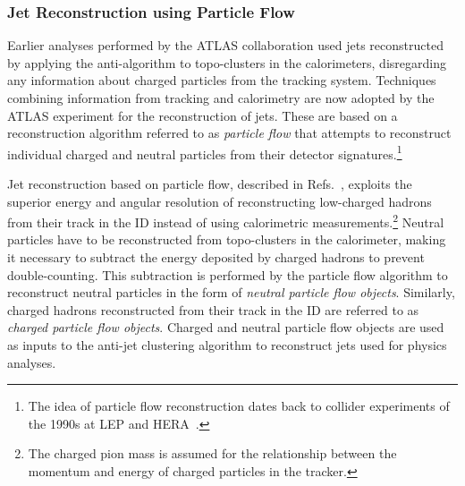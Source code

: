 \subsubsection{Jet Reconstruction using Particle Flow}


Earlier analyses performed by the ATLAS collaboration used jets reconstructed by
applying the anti-\kt algorithm to topo-clusters in the calorimeters,
disregarding any information about charged particles from the tracking
system. Techniques combining information from tracking and calorimetry are now
adopted by the ATLAS experiment for the reconstruction of jets. These are based
on a reconstruction algorithm referred to as \emph{particle flow} that attempts
to reconstruct individual charged and neutral particles from their detector
signatures.\footnote{The idea of particle flow reconstruction dates back to
  collider experiments of the 1990s at LEP and HERA~\cite{PERF-2015-09}.}

Jet reconstruction based on particle flow, described in
Refs.~\cite{PERF-2015-09,JETM-2018-05}, exploits the superior energy and angular
resolution of reconstructing low-\pT charged hadrons from their track in the ID
instead of using calorimetric measurements.\footnote{The charged pion mass is
  assumed for the relationship between the momentum and energy of charged
  particles in the tracker.} Neutral particles have to be reconstructed from
topo-clusters in the calorimeter, making it necessary to subtract the energy
deposited by charged hadrons to prevent double-counting. This subtraction is
performed by the particle flow algorithm to reconstruct neutral particles in the
form of \emph{neutral particle flow objects}. Similarly, charged hadrons
reconstructed from their track in the ID are referred to as \emph{charged
  particle flow objects}.  Charged and neutral particle flow objects are used as
inputs to the anti-\kt jet clustering algorithm to reconstruct jets used for
physics analyses.

